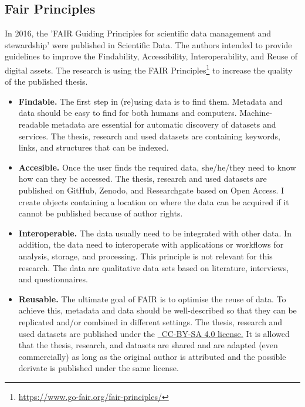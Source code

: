 \subsection{Fair Principles}
\label{sub:fair}
In 2016, the 'FAIR Guiding Principles for scientific data management and stewardship' were published in Scientific Data. The authors intended to provide guidelines to improve the Findability, Accessibility, Interoperability, and Reuse of digital assets. The research is using the FAIR Principles\footnote{\url{https://www.go-fair.org/fair-principles/}} to increase the quality of the published thesis.
\begin{itemize}
	\item{\textbf{Findable.} The first step in (re)using data is to find them. Metadata and data should be easy to find for both humans and computers. Machine-readable metadata are essential for automatic discovery of datasets and services. The thesis, research and used datasets are containing keywords, links, and structures that can be indexed.}
	\item{\textbf{Accesible.} Once the user finds the required data, she/he/they need to know how can they be accessed. The thesis, research and used datasets are published on GitHub, Zenodo, and Researchgate based on Open Access. I create objects containing a location on where the data can be acquired if it cannot be published because of author rights.}
	\item{\textbf{Interoperable.} The data usually need to be integrated with other data. In addition, the data need to interoperate with applications or workflows for analysis, storage, and processing. This principle is not relevant for this research. The data are qualitative data sets based on literature, interviews, and questionnaires.}
	\item{\textbf{Reusable.} The ultimate goal of FAIR is to optimise the reuse of data. To achieve this, metadata and data should be well-described so that they can be replicated and/or combined in different settings. The thesis, research and used datasets are published under the \href{https://creativecommons.org/licenses/by-sa/4.0/}{\ccbysa\ CC-BY-SA 4.0 license.} It is allowed that the thesis, research, and datasets are shared and are adapted (even commercially) as long as the original author is attributed and the possible derivate is published under the same license.}
\end{itemize}
